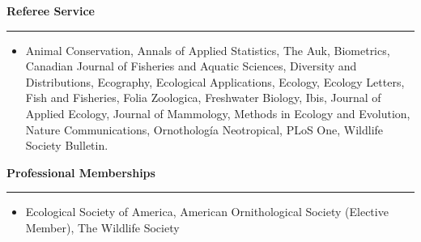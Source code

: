







\vspace{0.5cm}

{\large \bf Referee Service} \\
\rule[3mm]{\textwidth}{0.3mm}

\begin{itemize}
  \item[] Animal Conservation, Annals of Applied Statistics, The Auk,
    Biometrics, Canadian Journal of Fisheries and Aquatic Sciences,
    Diversity and Distributions, Ecography, Ecological Applications,
    Ecology, Ecology Letters, Fish and Fisheries, Folia Zoologica,
    Freshwater Biology, Ibis, Journal of Applied Ecology, Journal of
    Mammology, Methods in Ecology and Evolution, Nature
    Communications, Ornotholog\'{i}a Neotropical, PLoS One, Wildlife
    Society Bulletin.  
\end{itemize}




\vspace{0.5cm}

{\large \bf Professional Memberships} \\
\rule[3mm]{\textwidth}{0.3mm}

\begin{itemize}
\item[] Ecological Society of America, American Ornithological 
  Society (Elective Member), The Wildlife Society
\end{itemize}





\vspace{0.5cm}

